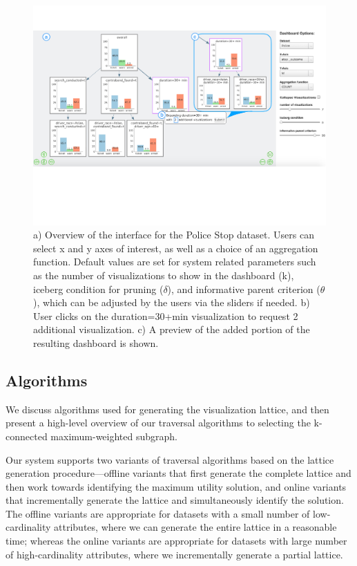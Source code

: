 \begin{figure}[ht!]
\centering
\includegraphics[width=0.8\linewidth,frame]{figures/overview_interface_expand.pdf}
\caption{a) Overview of the \system interface for the Police Stop dataset. Users can select x and y axes of interest, as well as a choice of an aggregation function. Default values are set for system related parameters such as the number of visualizations to show in the dashboard (k), iceberg condition for pruning ($\delta$), and informative parent criterion ($\theta$), which can be adjusted by the users via the sliders if needed. b) User clicks on the duration=30+min visualization to request 2 additional visualization. c) A preview of the added portion of the resulting dashboard is shown.}
\label{fig:overview}
\end{figure}
\subsection{Algorithms\label{sec:algorithms}}
We discuss algorithms used for generating the visualization lattice, and then present a high-level overview of our traversal algorithms to selecting the k-connected maximum-weighted subgraph.

 Our system supports two variants of traversal algorithms based on the lattice generation procedure---offline variants that first generate the complete lattice and then work towards identifying the maximum utility solution, and online variants that incrementally generate the lattice and simultaneously identify the solution. The offline variants are appropriate for datasets with a small number of low-cardinality attributes, where we can generate the entire lattice in a reasonable time; whereas the online variants are appropriate for datasets with large number of high-cardinality attributes, where we incrementally generate a partial lattice.

